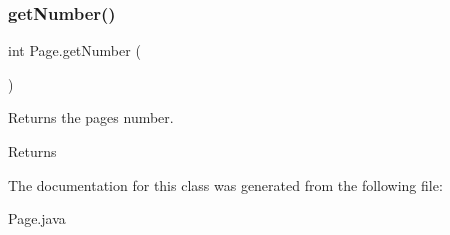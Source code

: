 \subsubsection{\texorpdfstring{get\+Number()}{getNumber()}}
{\footnotesize\ttfamily int Page.\+get\+Number (\begin{DoxyParamCaption}{ }\end{DoxyParamCaption})\hspace{0.3cm}{\ttfamily [inline]}}

Returns the page\textquotesingle{}s number. \begin{DoxyReturn}{Returns}

\end{DoxyReturn}


The documentation for this class was generated from the following file\+:\begin{DoxyCompactItemize}
\item 
Page.\+java\end{DoxyCompactItemize}
